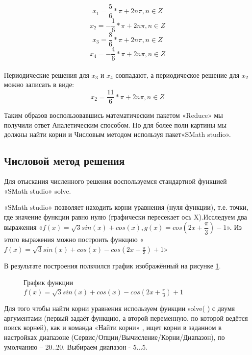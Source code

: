 \documentclass[russian,utf8,nocolumnxxxi,nocolumnxxxii]{eskdtext}
\begin{document}
$$x_1=\frac{5}{6}*\pi+2n\pi,n\in Z$$
$$x_2=-\frac{1}{6}*\pi+2n\pi,n\in Z$$
$$x_3=\frac{8}{6}*\pi+2n\pi,n\in Z$$
$$x_4=-\frac{4}{6}*\pi+2n\pi,n\in Z$$\\

Периодические решения для $x_3$ и $x_4$ совпадают, а периодическое решение для $x_2$ можно записать в виде:
$$x_2=\frac{11}{6}*\pi+2n\pi,n\in Z$$

Таким образов воспользовавшись математическим пакетом «Reduce» мы получили ответ Аналетическим способом. Но для более полн	 картины мы должны найти корни и Числовым методом используя пакет«SMath studio».

\subsection{Числовой метод решения} \label{resh}

Для отыскания численного решения воспользуемся стандартной функцией «SMath studio» solve.

«SMath studio» позволяет находить корни уравнения (нуля функции), т.е. точки, где значение функции равно нулю (графически пересекает ось X).Исследуем два выражения «$f(x)=\sqrt{3}sin(x)+cos(x),g(x)=cos(2x+\dfrac{\pi}{3})-1$». Из этого выражения можно построить функцию «$f(x)=\sqrt3 sin(x)+cos(x)-cos(2x+\frac{\pi}{3})+1$» 


В результате построения полкчился график изображённый на рисунке \ref{graf1}.
\begin{figure}[h]
\begin{center}
\caption{График функции $f(x)=\sqrt3 sin(x)+cos(x)-cos(2x+\frac{\pi}{3})+1$}
\label{graf1}
\end{center}
\end{figure}

Для того чтобы найти корни уравнения используем функции solve( ) с двумя аргументами (первый задаёт функцию, а второй переменную, по которой ведётся поиск корней), как и команда «Найти корни» , ищет корни в заданном в настройках диапазоне (Сервис/Опции/Вычисление/Корни/Диапазон), по умолчанию – 20..20. Выбираем диапазон - 5...5. 
\end{document}
